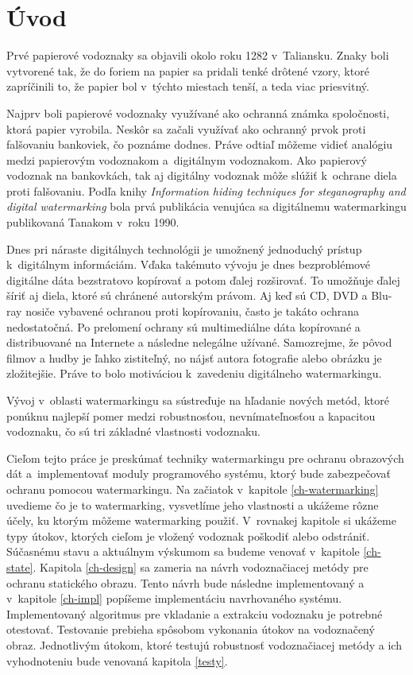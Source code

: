 \chapter{Úvod}
Prvé papierové vodoznaky sa objavili okolo roku 1282 v~Taliansku. Znaky boli vytvorené tak, že do foriem na papier sa pridali tenké drôtené vzory, ktoré zapríčinili to, že papier bol v~týchto miestach tenší, a teda viac priesvitný. \cite{Cox}

Najprv boli papierové vodoznaky využívané ako ochranná známka spoločnosti, ktorá papier vyrobila. Neskôr sa začali využívať ako ochranný prvok proti falšovaniu bankoviek, čo poznáme dodnes. Práve odtiaľ môžeme vidieť analógiu medzi papierovým vodoznakom a~digitálnym vodoznakom. Ako papierový vodoznak na bankovkách, tak aj digitálny vodoznak môže slúžiť k~ochrane diela proti falšovaniu. Podľa knihy {\it Information hiding techniques for steganography and digital watermarking} \cite{Katzenbeisser} bola prvá publikácia venujúca sa digitálnemu watermarkingu publikovaná Tanakom v~roku 1990.

Dnes pri náraste digitálnych technológii je umožnený jednoduchý prístup k~digitálnym informáciám. Vďaka takémuto vývoju je dnes bezproblémové digitálne dáta bezstratovo kopírovať a potom ďalej rozširovať. To umožňuje ďalej šíriť aj diela, ktoré sú chránené autorským právom. Aj keď sú CD, DVD a Blu-ray nosiče vybavené ochranou proti kopírovaniu, často je takáto ochrana nedostatočná. Po prelomení ochrany sú multimediálne dáta kopírované a distribuované na Internete a následne nelegálne užívané. Samozrejme, že pôvod filmov a hudby je ľahko zistiteľný, no nájsť autora fotografie alebo obrázku je zložitejšie. Práve to bolo motiváciou k~zavedeniu digitálneho watermarkingu.

Vývoj v~oblasti watermarkingu sa sústreďuje na hľadanie nových metód, ktoré ponúknu najlepší pomer medzi robustnosťou, nevnímateľnosťou a kapacitou vodoznaku, čo sú tri základné vlastnosti vodoznaku.

Cieľom tejto práce je preskúmať techniky watermarkingu pre ochranu obrazových dát a~implementovať moduly programového systému, ktorý bude zabezpečovať ochranu pomocou watermarkingu. Na začiatok v~kapitole \ref{ch-watermarking} uvedieme čo je to watermarking, vysvetlíme jeho vlastnosti a ukážeme rôzne účely, ku ktorým môžeme watermarking použiť. V~rovnakej kapitole si ukážeme typy útokov, ktorých cieľom je vložený vodoznak poškodiť alebo odstrániť. Súčasnému stavu a aktuálnym výskumom sa budeme venovať v~kapitole \ref{ch-state}. Kapitola \ref{ch-design} sa zameria na návrh vodoznačiacej metódy pre ochranu statického obrazu. Tento návrh bude následne implementovaný a v~kapitole \ref{ch-impl} popíšeme implementáciu navrhovaného systému. Implementovaný algoritmus pre vkladanie a extrakciu vodoznaku je potrebné otestovať. Testovanie prebieha spôsobom vykonania útokov na vodoznačený obraz. Jednotlivým útokom, ktoré testujú robustnosť vodoznačiacej metódy a ich vyhodnoteniu bude venovaná kapitola \ref{testy}.

